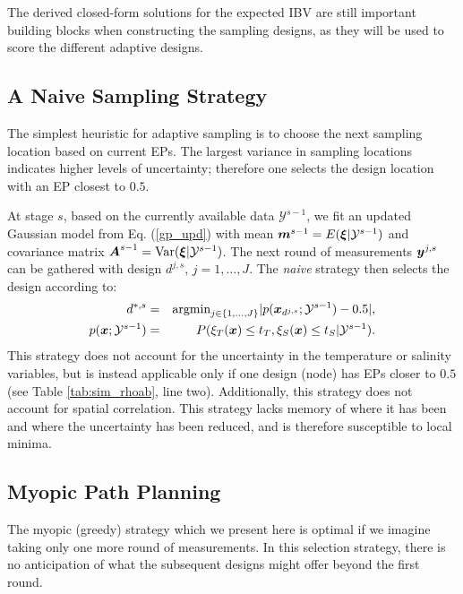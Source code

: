 \documentclass[aoas]{imsart}
\begin{document}
The derived closed-form solutions for the expected IBV are still
important building blocks when constructing the sampling designs, as
they will be used to score the different adaptive designs. %
 
\subsection{A Naive Sampling Strategy}
\label{naive}

The simplest heuristic for adaptive sampling is to choose the next
sampling location based on current EPs. The largest variance in
sampling locations indicates higher levels of uncertainty; therefore
one selects the design location with an EP closest to $0.5$.

At stage $s$, based on the currently available data
$\mathcal{Y}^{s-1}$, we fit an updated Gaussian model from
Eq. (\ref{gp_upd}) with mean ${\boldsymbol m}^{s-1}=E({\boldsymbol \xi}|\mathcal{Y}^{s-1})$
and covariance matrix ${\boldsymbol A}^{s-1}=\mbox{Var}({\boldsymbol \xi}|\mathcal{Y}^{s-1})$.
The next round of measurements ${\boldsymbol y}^{j,s}$ can be gathered with
design $d^{j,s}$, $j=1,\ldots,J$. The {\it{naive}} strategy then
selects the design according to:
\begin{eqnarray}\label{critNaive}
    d^{*,s} &=& \mbox{argmin}_{j \in \{1,\ldots,J\}} |p(\bx_{d^{j,s}};\mathcal{Y}^{s-1})-0.5|, \\
    p(\bx;\mathcal{Y}^{s-1}) &=& P(\xi_T(\bx) \leq t_T, \xi_S(\bx) \leq t_S | \mathcal{Y}^{s-1}). \nonumber
\end{eqnarray}
This strategy does not account for the uncertainty in the temperature
or salinity variables, but is instead applicable only if one design (node) has EPs closer to
$0.5$ (see Table \ref{tab:sim_rhoab}, line two). Additionally, this strategy does not
account for spatial correlation. This strategy lacks memory of where
it has been and where the uncertainty has been reduced, and is therefore
susceptible to local minima.

\subsection{Myopic Path Planning}
\label{myopic}

The myopic (greedy) strategy which we present here is optimal if we
imagine taking only one more round of measurements. In this selection
strategy, there is no anticipation of what the subsequent designs might
offer beyond the first round.
\end{document}
